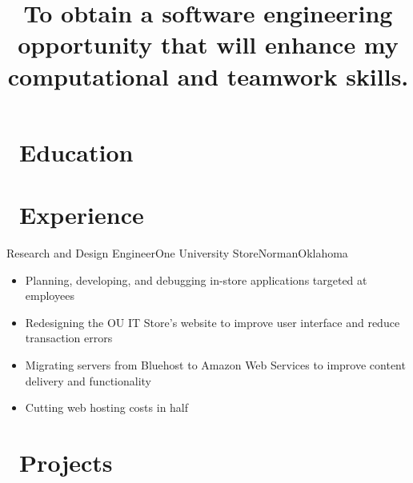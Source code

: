 \documentclass[language=english]{resume_cover_letter}
\title{To obtain a software engineering opportunity that will enhance my computational and teamwork skills.}
\begin{document}
\maketitle

\vspace*{-8mm}

\section{\faGraduationCap~Education}


\section{\faBriefcase~Experience}



\vspace*{2mm}

{Research and Design Engineer}{One University Store}{Norman}{Oklahoma}{\begin{itemize}
    \item Planning, developing, and debugging in-store applications targeted at employees
    \item Redesigning the OU IT Store's website to improve user interface and reduce transaction errors
    \item Migrating servers from Bluehost to Amazon Web Services to improve content delivery and functionality
    \item Cutting web hosting costs in half
\end{itemize}}{}

\section{\faGavel~Projects}
\end{document}
